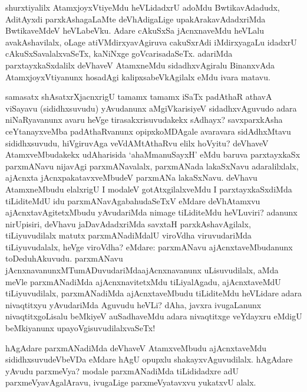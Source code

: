 \begin{artha}
shurxtiyalilx AtamxjoyxVtiyeMdu heVLidadxrU adoMdu BwtikavAdadudx, AditAyxdi parxkAshagaLaMte deVhAdigaLige upakArakavAdadx\-riMda BwtikaveMdeV heVLabeVku. Adare cAkuSxSa jAcnxnaveMdu heVLalu avakAshavilalx, oLage atiVMdirxyavAgiruva cakuSxrAdi iMdirxyagaLu idadxrU cAkuSxSavalalxvaSeTx, kaNiNxge goVcarisadaSeTx. adariMda parxtayxkaSxdalilx deVhaveV AtamxneMdu sidadhxvAgiralu BinanxvAda AtamxjoyxVtiyanunx hosadAgi kalipxsabeVkAgilalx eMdu ivara matavu.
\end{artha}


\begin{artha}
samasatx shAsatxrXjacnxrigU tamamx tamamx iSaTx padAthaR athavA viSayavu (sididhxsuvudu) yAvudanunx aMgiVkarisiyeV sidadhxvAguvudo adara niNaRyavanunx avaru heVge tirasakxrisuvudakekx sAdhayx? savxparxkAsha ceYtanayxveMba padAthaRvanunx opipxkoMDAgale avaravara sidAdhxMtavu sididhxsuvudu, hiVgiruvAga veVdAMtAthaRvu elilx hoVyitu? deVhaveV AtamxveMbudakekx udAharisida `ahaMmanuSayxH' eMdu baruva parxtayxkaSx parxmANavu nijavAgi parxmANavalalx, parxmANada lakaSxNavu adaralilxlalx, ajAcnxta jAcnxpakatavxveMbudeV parxmANa lakaSxNavu. deVhavu AtamxneMbudu elalxrigU I modaleV gotAtxgilalxveMdu I parxtayxkaSxdiMda tiLiditeMdU idu parxmANavAgabahudaSeTxV eMdare deVhAtamxvu ajAcnxtavAgitetxMbudu yAvudariMda nimage tiLiditeMdu heVLuviri? adanunx nirUpisiri, deVhavu jaDavAdadxriMda savxtaH parxkAshavAgilalx, tiLiyuvudilalx matutx parxmANadiMdalU viroVdha viruvudariMda tiLiyuvudalalx, heVge viroVdha? eMdare: parxmANavu ajAcnxtaveMbudanunx toDeduhAkuvudu. parxmANavu jAcnxnavanunxMTumADuvudariMda\break ajAcnxnavanunx uLisuvudilalx, aMda meVle parxmANadiMda ajAcnxnavitetxMdu tiLiyalAgadu, ajAcnxtaveMdU tiLiyuvudilalx, parxmANadiMda ajAcnxtaveMbudu tiLiditeMdu heVLidare adara nivaqtitxyu yAvudariMda Aguvudu heVLi? dAha, javxra ivugaLanunx nivaqtitxgoLisalu beMkiyeV auSadhaveMdu adara nivaqtitxge veYdayxru eMdigU beMkiyanunx upayoVgisuvudilalxvaSeTx!
\end{artha}

\begin{artha}
hAgAdare parxmANadiMda deVhaveV AtamxveMbudu ajAcnxtaveMdu sididhxsuvudeVbeVDa eMdare hAgU opupxlu shakayxvAguvudilalx. hAgAdare yAvudu parxmeVya? modale parxmANadiMda tiLididadxre adU parxmeVyavAgalAravu, ivugaLige parxmeVyatavxvu yukatxvU alalx.
\end{artha}

